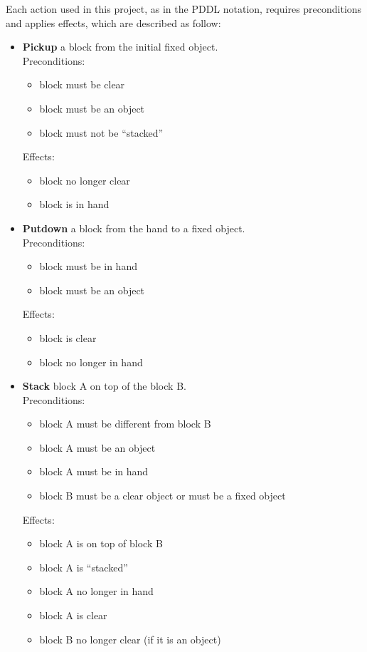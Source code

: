 Each action used in this project, as in the PDDL notation, requires preconditions and applies effects, which are described as follow:

\begin{itemize}

	\item \textbf{Pickup} a block from the initial fixed object. \\
Preconditions:
	\begin{itemize}
		\item block must be clear
		\item block must be an object
		\item block must not be \enquote{stacked}
	\end{itemize}
Effects:
	\begin{itemize}
		\item block no longer clear
		\item block is in hand
	\end{itemize}

	\item \textbf{Putdown} a block from the hand to a fixed object. \\
Preconditions:
	\begin{itemize}
		\item block must be in hand
		\item block must be an object
	\end{itemize}
Effects:
	\begin{itemize}
		\item block is clear
		\item block no longer in hand
	\end{itemize}

	\item \textbf{Stack} block A on top of the block B. \\
Preconditions:
	\begin{itemize}
		\item block A must be different from block B
		\item block A must be an object
		\item block A must be in hand
		\item block B must be a clear object or must be a fixed object
	\end{itemize}
Effects:
	\begin{itemize}
		\item block A is on top of block B
		\item block A is \enquote{stacked}
		\item block A no longer in hand
		\item block A is clear
		\item block B no longer clear (if it is an object)
	\end{itemize}


\end{itemize}

